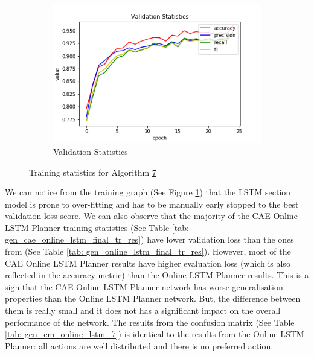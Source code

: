 \begin{figure}[h!]
\begin{subfigure}[b]{0.35\linewidth}
    \includegraphics[width=\linewidth]{images/cae_online_lstm/caelstm_section_lstm_training_block_map_10000_model_validation_stats.png}
     \caption{Validation Statistics}
  \end{subfigure}
  \caption{Training statistics for Algorithm \hyperref[tab: evalalgorithms]{7}}
  \label{fig: gen_train_olnine_lstm_7}
\end{figure}

\FloatBarrier

We can notice from the training graph (See Figure \ref{fig: gen_train_olnine_lstm_7}) that the LSTM section model is prone to over-fitting and has to be manually early stopped to the best validation loss score. We can also observe that the majority of the CAE Online LSTM Planner training statistics (See Table \ref{tab: gen_cae_online_lstm_final_tr_res}) have lower validation loss than the ones from (See Table \ref{tab: gen_online_lstm_final_tr_res}). However, most of the CAE Online LSTM Planner results have higher evaluation loss (which is also reflected in the accuracy metric) than the Online LSTM Planner results. This is a sign that the CAE Online LSTM Planner network has worse generalisation properties than the Online LSTM Planner network. But, the difference between them is really small and it does not has a significant impact on the overall performance of the network. The results from the confusion matrix (See Table \ref{tab: gen_cm_online_lstm_7}) is identical to the results from the Online LSTM Planner: all actions are well distributed and there is no preferred action.

